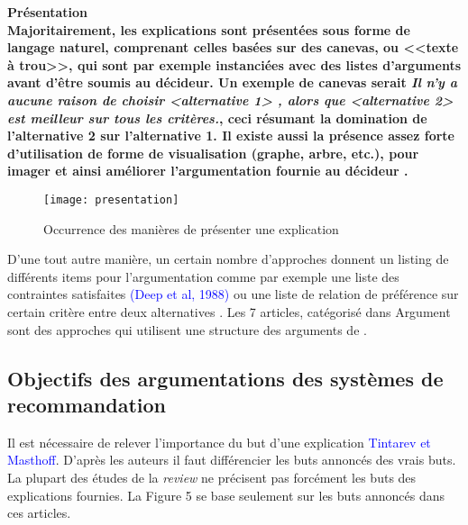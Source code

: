 \documentclass[a4paper, 11pt]{article}
\renewcommand{\textbf}[1]{\begingroup\bfseries\mathversion{bold}#1\endgroup}
\begin{document}

\noindent \textbf{Présentation}\\

Majoritairement, les explications sont présentées sous forme de langage naturel, comprenant celles basées sur des canevas, ou <<texte à trou>>, qui sont par exemple instanciées avec des listes d'arguments avant d’être soumis au décideur. Un exemple de canevas serait \textit{Il n'y a aucune raison de choisir <alternative 1> , alors que <alternative 2>
est meilleur sur tous les critères.}, ceci résumant la domination de l'alternative 2 sur l'alternative 1. Il existe aussi la présence assez forte d'utilisation de forme de visualisation (graphe, arbre, etc.), pour imager et ainsi améliorer l'argumentation fournie au décideur \textcolor{blue}{\citep{10.1007/978-3-642-22218-4_5,Narayanan}}.

\begin{figure}[!ht]
	\begin{center}
		\texttt{[image: presentation]}
		\caption{Occurrence des manières de présenter une explication}
	\end{center}
\end{figure}

D'une tout autre manière, un certain nombre d'approches donnent un listing de différents items pour l'argumentation comme par exemple une liste des contraintes satisfaites \textcolor{blue}{(Deep et al, 1988)} ou une liste de relation de préférence sur certain critère entre deux alternatives \textcolor{blue}{\citep{Labreuche2015}}. Les 7 articles, catégorisé dans Argument sont des approches qui utilisent une structure des arguments de \textcolor{blue}{\citep{Toulmin}}. 

\vspace{.5cm}

\subsection{Objectifs des argumentations des systèmes de recommandation}

Il est nécessaire de relever l'importance du but d’une explication \textcolor{blue}{Tintarev et Masthoff\citep{}}. D'après les auteurs il faut différencier les buts annoncés des vrais buts. La plupart des études de la \textit{review} ne précisent pas forcément les buts des explications fournies. La Figure 5 se base seulement sur les buts annoncés dans ces articles.
\end{document}
